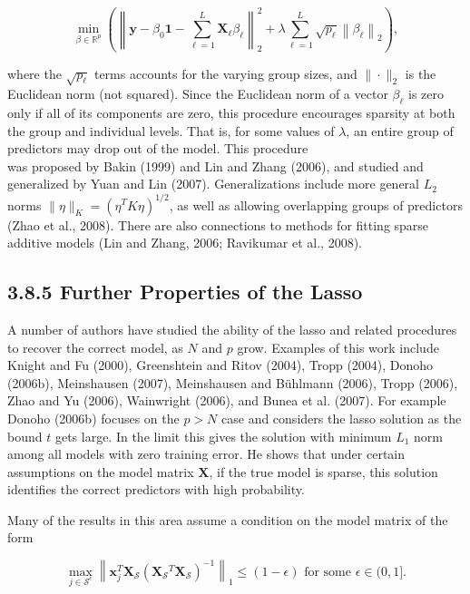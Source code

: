 \documentclass[10pt]{article}
\begin{document}
\begin{equation*}
\min _{\beta \in \mathbb{R}^{p}}\left(\left\|\mathbf{y}-\beta_{0} \mathbf{1}-\sum_{\ell=1}^{L} \mathbf{X}_{\ell} \beta_{\ell}\right\|_{2}^{2}+\lambda \sum_{\ell=1}^{L} \sqrt{p_{\ell}}\left\|\beta_{\ell}\right\|_{2}\right), \tag{3.80}
\end{equation*}


where the $\sqrt{p_{\ell}}$ terms accounts for the varying group sizes, and $\|\cdot\|_{2}$ is the Euclidean norm (not squared). Since the Euclidean norm of a vector $\beta_{\ell}$ is zero only if all of its components are zero, this procedure encourages sparsity at both the group and individual levels. That is, for some values of $\lambda$, an entire group of predictors may drop out of the model. This procedure\\
was proposed by Bakin (1999) and Lin and Zhang (2006), and studied and generalized by Yuan and Lin (2007). Generalizations include more general $L_{2}$ norms $\|\eta\|_{K}=\left(\eta^{T} K \eta\right)^{1 / 2}$, as well as allowing overlapping groups of predictors (Zhao et al., 2008). There are also connections to methods for fitting sparse additive models (Lin and Zhang, 2006; Ravikumar et al., 2008).

\subsection*{3.8.5 Further Properties of the Lasso}
A number of authors have studied the ability of the lasso and related procedures to recover the correct model, as $N$ and $p$ grow. Examples of this work include Knight and Fu (2000), Greenshtein and Ritov (2004), Tropp (2004), Donoho (2006b), Meinshausen (2007), Meinshausen and Bühlmann (2006), Tropp (2006), Zhao and Yu (2006), Wainwright (2006), and Bunea et al. (2007). For example Donoho (2006b) focuses on the $p>N$ case and considers the lasso solution as the bound $t$ gets large. In the limit this gives the solution with minimum $L_{1}$ norm among all models with zero training error. He shows that under certain assumptions on the model matrix $\mathbf{X}$, if the true model is sparse, this solution identifies the correct predictors with high probability.

Many of the results in this area assume a condition on the model matrix of the form


\begin{equation*}
\max _{j \in \mathcal{S}^{c}}\left\|\mathbf{x}_{j}^{T} \mathbf{X}_{\mathcal{S}}\left(\mathbf{X}_{\mathcal{S}}{ }^{T} \mathbf{X}_{\mathcal{S}}\right)^{-1}\right\|_{1} \leq(1-\epsilon) \text { for some } \epsilon \in(0,1] . \tag{3.81}
\end{equation*}
\end{document}
